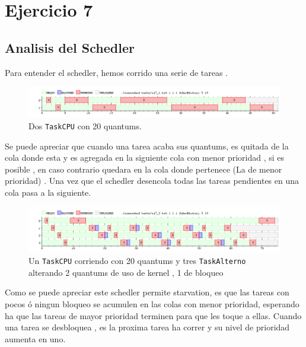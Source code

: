 \newpage
\section{Ejercicio 7}
	\subsection{Analisis del Schedler}

	Para entender el schedler, hemos corrido  una serie de tareas .

	\begin{figure}[ht]
		\begin{center}
			\includegraphics[width=1\columnwidth]{imagenes/ej7_1.png}
			\caption{Dos \texttt{TaskCPU} con 20 quantums.}
		\end{center}
	\end{figure}

	Se puede apreciar que cuando una  tarea acaba sus quantums, es quitada de la cola donde esta y es  agregada en la siguiente cola con menor prioridad , si es posible , en caso contrario quedara en la cola donde pertenece (La de menor prioridad) . Una vez que el schedler desencola todas las tareas pendientes en una cola pasa a la siguiente.


	\begin{figure}[ht]
		\begin{center}
			\includegraphics[width=1\columnwidth]{imagenes/ej7_2.png}
			\caption{Un \texttt{TaskCPU} corriendo con 20 quantums y tres \texttt{TaskAlterno} alterando 2 quantums de uso de kernel , 1 de bloqueo}
		\end{center}
	\end{figure}

	Como se puede apreciar este schedler permite starvation, es que las tareas con pocos ó ningun bloqueo se acumulen en las colas con menor prioridad, esperando ha que las tareas de mayor prioridad terminen para que les toque a ellas.
	Cuando una tarea se desbloquea , es la proxima tarea ha correr y su nivel de prioridad aumenta en uno.

